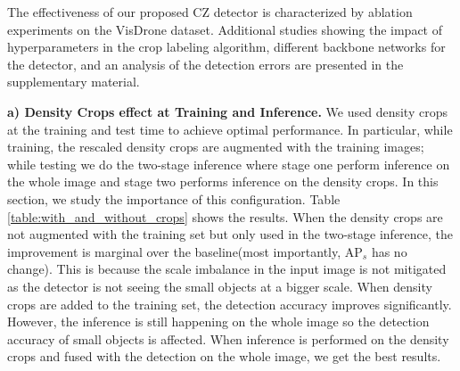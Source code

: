 The effectiveness of our proposed CZ detector is characterized by ablation experiments on the VisDrone dataset. Additional studies showing the impact of hyperparameters in the crop labeling algorithm, different backbone networks for the detector, and an analysis of the detection errors are presented in the supplementary material.

\noindent \textbf{a) Density Crops effect at Training and Inference.}  
We used density crops at the training and test time to achieve optimal performance. In particular, while training, the rescaled density crops are augmented with the training images; while testing we do the two-stage inference where stage one perform inference on the whole image and stage two performs inference on the density crops. In this section, we study the importance of this configuration. Table \ref{table:with_and_without_crops} shows the results. When the density crops are not augmented with the training set but only used in the two-stage inference, the improvement is marginal over the baseline(most importantly, $\textrm{AP}_{s}$ has no change). This is because the scale imbalance in the input image is not mitigated as the detector is not seeing the small objects at a bigger scale. When density crops are added to the training set, the detection accuracy improves significantly. However, the inference is still happening on the whole image so the detection accuracy of small objects is affected. When inference is performed on the density crops and fused with the detection on the whole image, we get the best results.
\setlength{\textfloatsep}{0.3cm}
\begin{table}
    \centering
    \caption{Detection results with and without density crops at train time and test time.}
    \label{table:with_and_without_crops}
\end{table}


